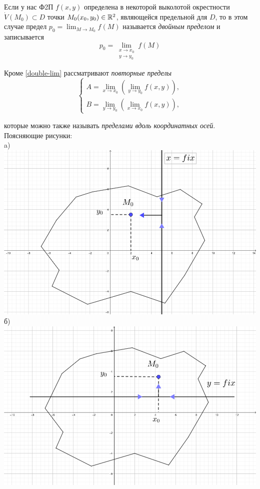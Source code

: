 \documentclass[../../main.tex]{subfiles}
\begin{document}
Если у нас Ф2П $f(x, y)$ определена в некоторой выколотой окрестности 
$\dot{V}(M_0) \subset D$ точки $M_0(x_0, y_0) \in \mathbb{R}^2$,
являющейся предельной для $D$, то в этом случае  предел
$p_0 = \displaystyle \lim_{M \to M_0}{f(M)}$ называется
\emph{двойным пределом} и записывается 
\begin{equation}
\label{double-lim}
p_0 = \underset{\substack{
	x \to x_0 \\
	y \to y_0
}}{\lim}f(M)
\end{equation}

Кроме \eqref{double-lim} рассматривают \emph{повторные пределы}
\begin{equation}
\label{rep-lim}
	\left\{\begin{aligned}
		A = \displaystyle\lim_{x \to x_0}{\left(\lim_{y \to y_0}{f(x, y)}\right)}, \\
		B = \displaystyle\lim_{y \to y_0}{\left(\lim_{x \to x_0}{f(x, y)}\right)}, 
	\end{aligned}\right.
\end{equation}

которые можно также называть \emph{пределами вдоль координатных осей}.
Поясняющие рисунки: \\
a) 
\includegraphics[scale=1.0]{rep-lim-case-a.png}
б) 
\includegraphics[scale=1.0]{rep-lim-case-b.png}
\end{document}
